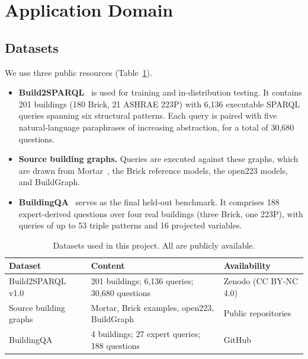 \documentclass[11pt]{article}
\begin{document}
\section{Application Domain}

\subsection{Datasets}

We use three public resources (Table~\ref{tab:data}).
\begin{itemize}
  \item \textbf{Build2SPARQL}~\cite{jung2026build2sparql} is used for training and in-distribution testing. It contains 201 buildings (180 Brick, 21 ASHRAE 223P) with 6{,}136 executable SPARQL queries spanning six structural patterns. Each query is paired with five natural-language paraphrases of increasing abstraction, for a total of 30{,}680 questions.
  \item \textbf{Source building graphs.} Queries are executed against these graphs, which are drawn from Mortar~\cite{fierro2019mortar}, the Brick reference models, the open223 models, and BuildGraph.
  \item \textbf{BuildingQA}~\cite{mulayim2025buildingqa} serves as the final held-out benchmark. It comprises 188 expert-derived questions over four real buildings (three Brick, one 223P), with queries of up to 53 triple patterns and 16 projected variables.
\end{itemize}

\begin{table}[h]
\centering
\small
\caption{Datasets used in this project. All are publicly available.}
\label{tab:data}
\begin{tabularx}{\linewidth}{@{}l X l@{}}
\toprule
Dataset & Content & Availability \\
\midrule
Build2SPARQL v1.0~\cite{jung2026build2sparql} & 201 buildings; 6{,}136 queries; 30{,}680 questions & Zenodo (CC BY-NC 4.0) \\
Source building graphs & Mortar, Brick examples, open223, BuildGraph & Public repositories \\
BuildingQA~\cite{mulayim2025buildingqa} & 4 buildings; 27 expert queries; 188 questions & GitHub \\
\bottomrule
\end{tabularx}
\end{table}
\end{document}
